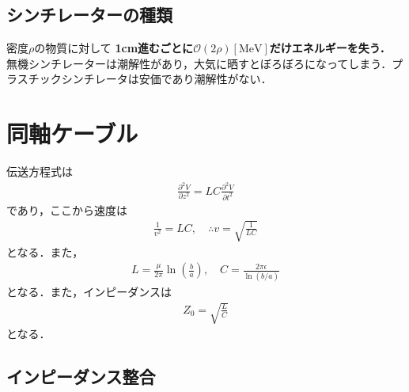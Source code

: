 \documentclass[12pt,dvipdfmx]{jsarticle}
\begin{document}
\subsection*{シンチレーターの種類}
密度$\rho$の物質に対して
\textbf{1cm進むごとに$\mathcal{O}(2\rho)[\text{MeV}]$だけエネルギーを失う．}
無機シンチレーターは潮解性があり，大気に晒すとぼろぼろになってしまう．プラスチックシンチレータは安価であり潮解性がない．
\section*{\Large{同軸ケーブル}}
伝送方程式は
\begin{eqnarray}
  \frac{\partial^2 V}{\partial z^2} = LC\frac{\partial^2 V}{\partial t^2}
\end{eqnarray}
であり，ここから速度は
\begin{eqnarray}
  \frac{1}{v^2} = LC,\quad\therefore v =\sqrt{\frac{1}{LC}}
\end{eqnarray}
となる．また，
\begin{eqnarray}
  L = \frac{\mu}{2\pi}\ln\left(\frac{b}{a}\right),\quad C = \frac{2\pi\epsilon}{\ln(b/a)}
\end{eqnarray}
となる．また，インピーダンスは
\begin{eqnarray}
  Z_0 = \sqrt{\frac{L}{C}}
\end{eqnarray}
となる．
\subsection*{インピーダンス整合}
\end{document}

